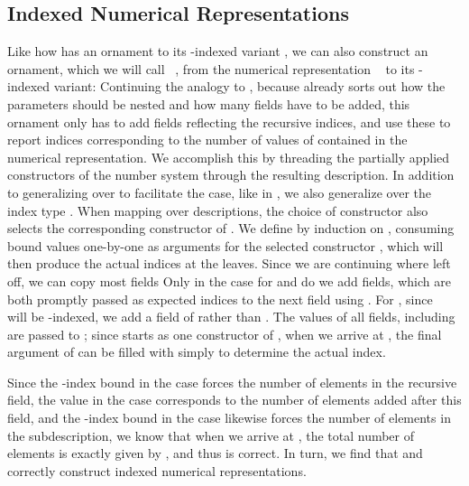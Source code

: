 \subsection{Indexed Numerical Representations}\label{sec:itrieo}
Like how  has an ornament  to its \bN{}-indexed variant , we can also construct an ornament, which we will call \ , from the numerical representation \  to its -indexed variant:
Continuing the analogy to , because  already sorts out how the parameters should be nested and how many fields have to be added, this ornament only has to add fields reflecting the recursive indices, and use these to report indices corresponding to the number of values of  contained in the numerical representation. We accomplish this by threading the partially applied constructors  of the number system  through the resulting description. In addition to generalizing over  to facilitate the  case, like in , we also generalize over the index type . When mapping over descriptions, the choice of constructor also selects the corresponding constructor of .
We define  by induction on , consuming bound values one-by-one as arguments for the selected constructor , which will then produce the actual indices at the leaves. Since we are continuing where  left off, we can copy most fields
Only in the case for  and  do we add fields, which are both promptly passed as expected indices to the next field using . For , since \  will be -indexed, we add a field of  rather than . The values of all fields, including  are passed to ; since  starts as one constructor  of , when we arrive at , the final argument of  can be filled with simply  to determine the actual index.

Since the -index bound in the  case forces the number of elements in the recursive field, the value in the  case corresponds to the number of elements added after this field, and the -index bound in the  case likewise forces the number of elements in the subdescription, we know that when we arrive at , the total number of elements is exactly given by , and thus  is correct. In turn, we find that  and  correctly construct indexed numerical representations.

